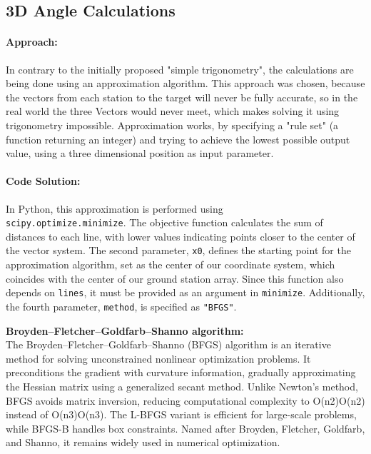 
\subsection{3D Angle Calculations}
\paragraph{Approach:}
In contrary to the initially proposed "simple trigonometry", the calculations are being done using an approximation algorithm. This approach was chosen, because the vectors from each station to the target will never be fully accurate, so in the real world the three Vectors would never meet, which makes solving it using trigonometry impossible. Approximation works, by specifying a "rule set" (a function returning an integer) and trying to achieve the lowest possible output value, using a three dimensional position as input parameter. 

\paragraph{Code Solution:}
In Python, this approximation is performed using \\ \texttt{scipy.optimize.minimize}. The objective function calculates the sum of distances to each line, with lower values indicating points closer to the center of the vector system. The second parameter, \texttt{x0}, defines the starting point for the approximation algorithm, set as the center of our coordinate system, which coincides with the center of our ground station array. Since this function also depends on \texttt{lines}, it must be provided as an argument in \texttt{minimize}. Additionally, the fourth parameter, \texttt{method}, is specified as \texttt{"BFGS"}.

\textbf{Broyden–Fletcher–Goldfarb–Shanno algorithm:} \\
The Broyden–Fletcher–Goldfarb–Shanno (BFGS) algorithm is an iterative method for solving unconstrained nonlinear optimization problems. It preconditions the gradient with curvature information, gradually approximating the Hessian matrix using a generalized secant method. Unlike Newton’s method, BFGS avoids matrix inversion, reducing computational complexity to O(n2)O(n2) instead of O(n3)O(n3). The L-BFGS variant is efficient for large-scale problems, while BFGS-B handles box constraints. Named after Broyden, Fletcher, Goldfarb, and Shanno, it remains widely used in numerical optimization.\citep{BFGS_wiki}

